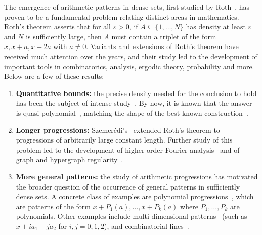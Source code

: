 \documentclass[11pt]{article}
\newcommand\eps{\varepsilon}
\begin{document}
The emergence of arithmetic patterns in dense sets, first studied by Roth~\cite{Roth}, has proven to be a fundamental problem relating distinct areas in mathematics. Roth's theorem asserts that for all $\eps>0$, if $A\subseteq \{1,\ldots,N\}$ has density at least $\eps$ and $N$ is sufficiently large, then $A$ must contain a triplet of the form $x,x+a,x+2a$ with $a\neq 0$. Variants and extensions of Roth's theorem have received much attention over the years, and their study led to the development of important tools in combinatorics, analysis, ergodic theory, probability and more. Below are a few of these results:
\begin{enumerate}
    \item {\bf Quantitative bounds:} the precise density needed for the conclusion to hold has been the subject of intense study~\cite{Bourgain1999,Bourgain2008,Sanders2011,BloomSisask2019,BloomSisask2020,KelleyMeka2023}. By now, it is known that the answer is quasi-polynomial~\cite{KelleyMeka2023,BloomSisask2023}, matching the shape of the best known construction~\cite{Behrend1946,ElsholtzHunterProskeSauermann2024}.
    \item {\bf Longer progressions:} Szemer\'edi's~\cite{Szemeredi1975} extended Roth's theorem to progressions of arbitrarily large constant length. Further study of this problem led to the
    development of higher-order Fourier analysis~\cite{Gowers1998,Gowers2001} and of graph and hypergraph regularity~\cite{Szemeredi1978,RuzsaSzemeredi1978,Gowers2007}.
    \item {\bf More general patterns:} the study of arithmetic progressions has motivated the broader question of the occurrence of general patterns in sufficiently dense sets. A concrete class of examples are polynomial progressions~\cite{BergelsonLeibman1996}, which are patterns of the form $x+P_1(a),\ldots,x+P_k(a)$ where $P_1,\ldots,P_k$ are polynomials. Other examples include multi-dimensional patterns~\cite{FurstenbergKatznelson1978,Gowers2007} (such as $x+ia_1+ja_2$ for $i,j=0,1,2$), and combinatorial lines~\cite{FurstenbergKatznelson1991,Polymath2012,BKLMDHJ}.
\end{enumerate}
\end{document}
